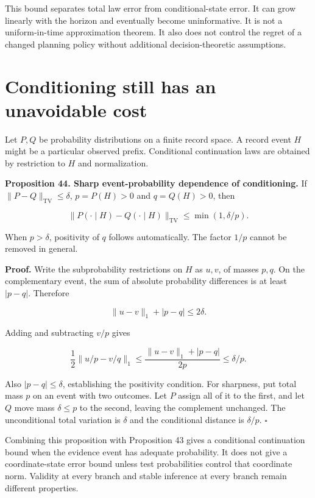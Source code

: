 This bound separates total law error from conditional-state error. It
can grow linearly with the horizon and eventually become uninformative.
It is not a uniform-in-time approximation theorem. It also does not
control the regret of a changed planning policy without additional
decision-theoretic assumptions.

\section{Conditioning still has an unavoidable cost}\label{LSM:conditioning-still-has-an-unavoidable-cost}

Let \(P,Q\) be probability distributions on a finite record space. A
record event \(H\) might be a particular observed prefix. Conditional
continuation laws are obtained by restriction to \(H\) and
normalization.

\textbf{Proposition 44. Sharp event-probability dependence of
conditioning.} If \(\|P-Q\|_{\mathrm{TV}}\leq\delta\), \(p=P(H)>0\) and
\(q=Q(H)>0\), then

\[
\boxed{\|P(\cdot\mid H)-Q(\cdot\mid H)\|_{\mathrm{TV}}
\leq\min(1,\delta/p).}
\]

When \(p>\delta\), positivity of \(q\) follows automatically. The factor
\(1/p\) cannot be removed in general.

\textbf{Proof.} Write the subprobability restrictions on \(H\) as
\(u,v\), of masses \(p,q\). On the complementary event, the sum of
absolute probability differences is at least \(|p-q|\). Therefore

\[
\|u-v\|_1+|p-q|\leq2\delta.
\]

Adding and subtracting \(v/p\) gives

\[
\frac12\|u/p-v/q\|_1
\leq\frac{\|u-v\|_1+|p-q|}{2p}
\leq\delta/p.
\]

Also \(|p-q|\leq\delta\), establishing the positivity condition. For
sharpness, put total mass \(p\) on an event with two outcomes. Let \(P\)
assign all of it to the first, and let \(Q\) move mass \(\delta\leq p\)
to the second, leaving the complement unchanged. The unconditional total
variation is \(\delta\) and the conditional distance is \(\delta/p\).
\(\square\)

Combining this proposition with Proposition 43 gives a conditional
continuation bound when the evidence event has adequate probability. It
does not give a coordinate-state error bound unless test probabilities
control that coordinate norm. Validity at every branch and stable
inference at every branch remain different properties.

